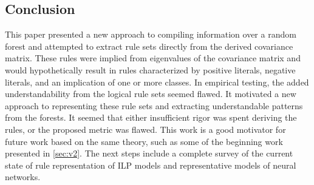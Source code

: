 \documentclass[11pt]{article}
\begin{document}

\subsection{Conclusion}
\label{sec:conc}
This paper presented a new approach to compiling information over a random forest and attempted to extract rule sets directly from the derived covariance matrix. These rules were implied from eigenvalues of the covariance matrix and would hypothetically result in rules characterized by positive literals, negative literals, and an implication of one or more classes. In empirical testing, the added understandability from the logical rule sets seemed flawed. It motivated a new approach to representing these rule sets and extracting understandable patterns from the forests. It seemed that either insufficient rigor was spent deriving the rules, or the proposed metric was flawed. This work is a good motivator for future work based on the same theory, such as some of the beginning work presented in \ref{sec:v2}. The next steps include a complete survey of the current state of rule representation of ILP models and representative models of neural networks. 

 
\vskip 0.2in

\end{document}
